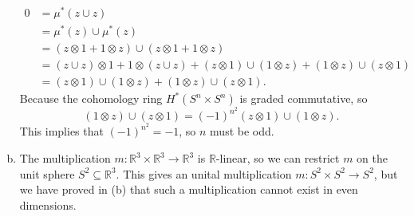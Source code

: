 \documentclass[letterpaper, 12pt]{article}
\begin{document}
\begin{solution}
\begin{enumerate}[(a)]
\begin{align*}
0&=\mu^*(z\cup z)\\
 &=\mu^*(z)\cup\mu^*(z)\\ 
 &=(z\otimes 1+1\otimes z)\cup (z\otimes 1+1\otimes z)\\ 
 &=(z\cup z)\otimes 1+1\otimes (z\cup z)+ (z\otimes 1)\cup (1\otimes z)+(1\otimes z)\cup (z\otimes 1)\\
 &=(z\otimes 1)\cup (1\otimes z)+(1\otimes z)\cup (z\otimes 1).
\end{align*}
Because the cohomology ring \(H^*(S^n\times S^n)\) is graded commutative, so 
\[(1\otimes z)\cup (z\otimes 1)=(-1)^{n^2}(z\otimes 1)\cup (1\otimes z).\]
This implies that \((-1)^{n^2}=-1\), so \(n\) must be odd. 
\item The multiplication \(m:\mathbb{R}^3\times \mathbb{R}^3\rightarrow \mathbb{R}^3\) is \(\mathbb{R}\)-linear, so we can restrict \(m\) on the unit sphere \(S^2\subseteq \mathbb{R}^3\). This gives an unital multiplication \(m:S^2\times S^2\rightarrow S^2\), but we have proved in (b) that such a multiplication cannot exist in even dimensions. 
\end{enumerate}
\end{solution}
\end{document}

